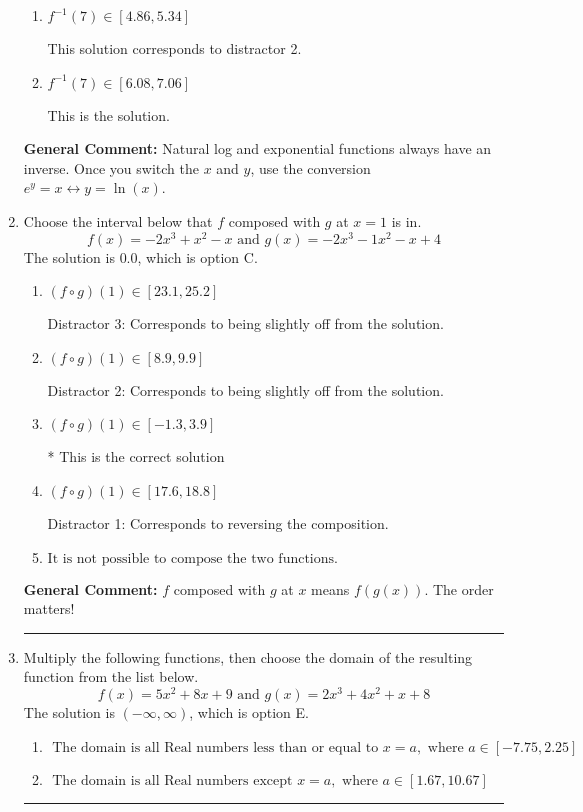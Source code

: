 \documentclass{extbook}[14pt]
\newcommand{\litem}[1]{\item #1

\rule{\textwidth}{0.4pt}}
\begin{document}
\begin{enumerate}
{\begin{enumerate}[label=\Alph*.]
 This solution corresponds to distractor 3.
\item \( f^{-1}(7) \in [4.86, 5.34] \)

 This solution corresponds to distractor 2.
\item \( f^{-1}(7) \in [6.08, 7.06] \)

 This is the solution.
\end{enumerate}

\textbf{General Comment:} Natural log and exponential functions always have an inverse. Once you switch the $x$ and $y$, use the conversion $ e^y = x \leftrightarrow y=\ln(x)$.
}
\litem{
Choose the interval below that $f$ composed with $g$ at $x=1$ is in.
\[ f(x) = -2x^{3} + x^{2} -x \text{ and } g(x) = -2x^{3} -1 x^{2} -x + 4 \]The solution is \( 0.0 \), which is option C.\begin{enumerate}[label=\Alph*.]
\item \( (f \circ g)(1) \in [23.1, 25.2] \)

 Distractor 3: Corresponds to being slightly off from the solution.
\item \( (f \circ g)(1) \in [8.9, 9.9] \)

 Distractor 2: Corresponds to being slightly off from the solution.
\item \( (f \circ g)(1) \in [-1.3, 3.9] \)

* This is the correct solution
\item \( (f \circ g)(1) \in [17.6, 18.8] \)

 Distractor 1: Corresponds to reversing the composition.
\item \( \text{It is not possible to compose the two functions.} \)


\end{enumerate}

\textbf{General Comment:} $f$ composed with $g$ at $x$ means $f(g(x))$. The order matters!
}
\litem{
Multiply the following functions, then choose the domain of the resulting function from the list below.
\[ f(x) = 5x^{2} +8 x + 9 \text{ and } g(x) = 2x^{3} +4 x^{2} +x + 8 \]The solution is \( (-\infty, \infty) \), which is option E.\begin{enumerate}[label=\Alph*.]
\item \( \text{ The domain is all Real numbers less than or equal to } x = a, \text{ where } a \in [-7.75, 2.25] \)


\item \( \text{ The domain is all Real numbers except } x = a, \text{ where } a \in [1.67, 10.67] \)



\end{enumerate}}
\end{enumerate}
\end{document}
